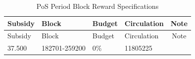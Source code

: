 \documentclass[11pt,a4paperpaper,]{report}
\begin{document}
\begin{longtable}[]{@{}llllc@{}}
\caption{PoS Period Block Reward Specifications
\label{ref_c_table}}\tabularnewline
\toprule
\begin{minipage}[b]{0.12\columnwidth}\raggedright\strut
Subsidy\strut
\end{minipage} & \begin{minipage}[b]{0.23\columnwidth}\raggedright\strut
Block\strut
\end{minipage} & \begin{minipage}[b]{0.14\columnwidth}\raggedright\strut
Budget\strut
\end{minipage} & \begin{minipage}[b]{0.19\columnwidth}\raggedright\strut
Circulation\strut
\end{minipage} & \begin{minipage}[b]{0.16\columnwidth}\centering\strut
Note\strut
\end{minipage}\tabularnewline
\midrule
\endfirsthead
\toprule
\begin{minipage}[b]{0.12\columnwidth}\raggedright\strut
Subsidy\strut
\end{minipage} & \begin{minipage}[b]{0.23\columnwidth}\raggedright\strut
Block\strut
\end{minipage} & \begin{minipage}[b]{0.14\columnwidth}\raggedright\strut
Budget\strut
\end{minipage} & \begin{minipage}[b]{0.19\columnwidth}\raggedright\strut
Circulation\strut
\end{minipage} & \begin{minipage}[b]{0.16\columnwidth}\centering\strut
Note\strut
\end{minipage}\tabularnewline
\midrule
\endhead
\begin{minipage}[t]{0.12\columnwidth}\raggedright\strut
37.500\strut
\end{minipage} & \begin{minipage}[t]{0.23\columnwidth}\raggedright\strut
182701-259200\strut
\end{minipage} & \begin{minipage}[t]{0.14\columnwidth}\raggedright\strut
0\%\strut
\end{minipage} & \begin{minipage}[t]{0.19\columnwidth}\raggedright\strut
11805225\strut
\end{minipage} & \begin{minipage}[t]{0.16\columnwidth}\centering\strut

\end{minipage}
\end{longtable}
\end{document}
